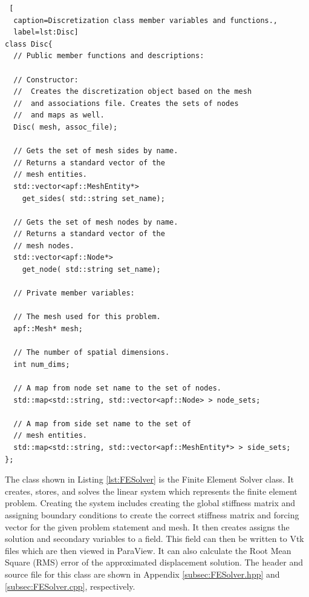 \documentclass[a4paper, 12pt]{article}
\begin{document}
\begin{lstlisting} [
  caption=Discretization class member variables and functions.,
  label=lst:Disc]
class Disc{
  // Public member functions and descriptions:

  // Constructor:
  //  Creates the discretization object based on the mesh
  //  and associations file. Creates the sets of nodes
  //  and maps as well.
  Disc( mesh, assoc_file);

  // Gets the set of mesh sides by name.
  // Returns a standard vector of the
  // mesh entities.
  std::vector<apf::MeshEntity*>
    get_sides( std::string set_name);

  // Gets the set of mesh nodes by name.
  // Returns a standard vector of the
  // mesh nodes.
  std::vector<apf::Node*>
    get_node( std::string set_name);

  // Private member variables:

  // The mesh used for this problem.
  apf::Mesh* mesh;

  // The number of spatial dimensions.
  int num_dims;

  // A map from node set name to the set of nodes.
  std::map<std::string, std::vector<apf::Node> > node_sets;

  // A map from side set name to the set of
  // mesh entities.
  std::map<std::string, std::vector<apf::MeshEntity*> > side_sets;
};
\end{lstlisting}
\vspace{\baselineskip}

The class shown in Listing
\ref{lst:FESolver} is the
Finite Element Solver
class.
It creates, stores, and solves the linear system which represents
the finite element problem. Creating the system includes creating the
global stiffness matrix and assigning boundary conditions to create
the correct stiffness matrix and forcing vector for the given
problem statement and mesh. It then creates assigns the solution
and secondary variables to a field. This field can then be written
to Vtk files which are then viewed in ParaView. It can also calculate the
Root Mean Square (RMS) error of the approximated displacement solution.
The header and source file for this class are shown in Appendix
\ref{subsec:FESolver.hpp} and
\ref{subsec:FESolver.cpp},
respectively.
\end{document}
